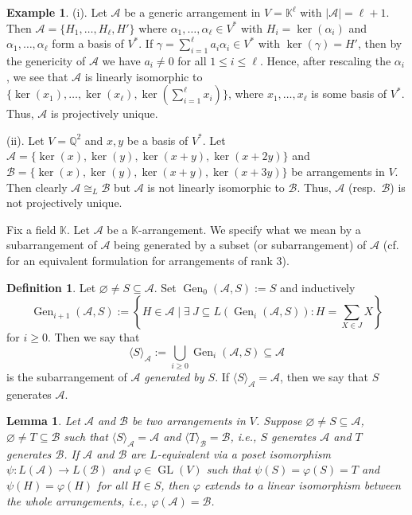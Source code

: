 \documentclass[12pt]{amsart}
\newcommand\CA{{\mathscr A}}
\newcommand\CB{{\mathscr B}}
\newcommand\BBK{{\mathbb K}}
\newcommand\BBQ{{\mathbb Q}}
\newcommand\GL{\operatorname{GL}}
\newcommand\Gen{\operatorname{Gen}}
\numberwithin{equation}{section}
\theoremstyle{plain}
\newtheorem{lemma}[equation]{Lemma}
\theoremstyle{definition}
\newtheorem{defn}[equation]{Definition}
\newtheorem{example}[equation]{Example}
\begin{document}
\begin{example}%
	\label{ex:Proj(non)unique}
	(i). Let $\CA$ be a generic arrangement in $V = \BBK^\ell$ with $|\CA| = \ell+1$.
			Then $\CA = \{H_1,\ldots,H_\ell,H'\}$ where $\alpha_1,\ldots,\alpha_\ell \in V^*$
			with $H_i = \ker(\alpha_i)$ and $\alpha_1,\ldots,\alpha_\ell$ form a basis of $V^*$.
			If $\gamma = \sum_{i=1}^\ell a_i\alpha_i \in V^*$ with $\ker(\gamma) = H'$, then by the genericity of $\CA$
			we have $a_i\neq 0$ for all $1\leq i \leq \ell$. Hence, after rescaling the $\alpha_i$,
			we see that $\CA$ is linearly isomorphic to $\{\ker(x_1),\ldots,\ker(x_\ell),\ker(\sum_{i=1}^\ell x_i)\}$,
			where $x_1,\ldots,x_\ell$ is some basis of $V^*$.
			Thus, $\CA$ is projectively unique.
			
		(ii). Let $V = \BBQ^2$ and $x,y$ be a basis of $V^*$.
			Let $\CA = \{\ker(x),\ker(y),\ker(x+y),\ker(x+2y)\}$ and $\CB = \{\ker(x),\ker(y),\ker(x+y),\ker(x+3y)\}$ be arrangements in $V$.
			Then clearly $\CA \cong_L \CB$ but $\CA$ is not linearly isomorphic to $\CB$.
			Thus, $\CA$ (resp.\ $\CB$) is not projectively unique.
\end{example}

Fix a field $\BBK$.
Let $\CA$ be a $\BBK$-arrangement.
We specify what we mean by a subarrangement of $\CA$ being generated by a subset (or subarrangement) of $\CA$ 
(cf.\ \cite[Def.~3.4]{Cun21_Greedy} for an equivalent formulation for arrangements of rank $3$).

\begin{defn}
	\label{def:gen}
	Let $\varnothing \ne S \subseteq \CA$. Set $\Gen_0(\CA,S) := S$ and inductively $$\Gen_{i+1}(\CA,S) := \left\{H \in \CA \mid \exists\  J \subseteq L(\Gen_i(\CA,S)) : H = \sum_{X \in J} X \right\}$$ for $i \ge 0$.
	Then we say that
	$$\langle S \rangle_\CA := \bigcup_{i\ge 0} \Gen_i(\CA,S) \subseteq \CA$$
	is the subarrangement of $\CA$
	\emph{generated by $S$}. If $\langle S \rangle_\CA  = \CA$, then we say that $S$ generates $\CA$. 
\end{defn}

\begin{lemma}
	\label{lem:gen}
	Let $\CA$ and $\CB$ be two arrangements in $V$.
	Suppose $\varnothing \ne S \subseteq \CA$, $\varnothing \ne T \subseteq \CB$
	such that $\langle S \rangle_\CA = \CA$ and $\langle T \rangle_\CB = \CB$, i.e., $S$ generates $\CA$
	and $T$ generates $\CB$.
	If $\CA$ and $\CB$ are $L$-equivalent via a poset isomorphism $\psi:L(\CA)\to L(\CB)$ and $\varphi \in \GL(V)$
	such that $\psi(S) = \varphi(S) = T$ and $\psi(H) = \varphi(H)$ for all $H \in S$, 
	then $\varphi$ extends to a linear isomorphism between the whole arrangements, i.e., 
	$\varphi(\CA) = \CB$.
\end{lemma}
\end{document}
